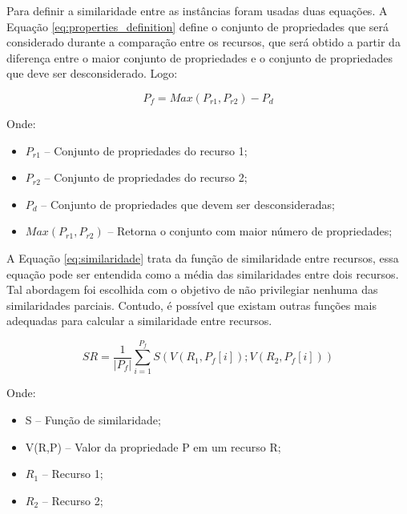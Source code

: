 Para definir a similaridade entre as instâncias foram usadas duas equações. A Equação \ref{eq:properties_definition} define o conjunto de propriedades que será considerado durante a comparação entre os recursos, que será obtido a partir da diferença entre  o maior conjunto de propriedades e o conjunto de propriedades que deve ser desconsiderado. Logo:

\begin{equation}
P_f =M a x  ( P_{r1} ,P_{r2} ) - P_d
\label{eq:properties_definition}
\end{equation}

Onde:
\begin{itemize}
	\item $P_{r1}$ – Conjunto de propriedades do recurso 1;
	\item $P_{r2}$ – Conjunto de propriedades do recurso 2;
	\item $P_d$ –  Conjunto de propriedades que devem ser desconsideradas;
	\item $M a x  ( P_{r1} ,P_{r2} )$ – Retorna o conjunto com maior número de propriedades;
\end{itemize}

A Equação \ref{eq:similaridade} trata da função de similaridade entre recursos, essa equação pode ser entendida como a média das similaridades entre dois recursos. Tal abordagem foi escolhida com o objetivo de não privilegiar nenhuma das similaridades parciais. Contudo, é possível que existam outras funções mais adequadas para calcular a similaridade entre recursos.
% 
% 
%
%

\begin{equation}
SR  = \frac{1}{|P_f|} { \sum_{i = 1}^{P_f} {S(V(R_1,P_f[i]);V(R_2,P_f[i]))}}
\label{eq:similaridade}
\end{equation}

Onde:

\begin{itemize}
	\item S – Função de similaridade;
% 
% 
%
%
	\item V(R,P) – Valor da propriedade P em um recurso R;
	\item $R_1$ – Recurso 1;
	\item $R_2$ – Recurso 2;
\end{itemize}

